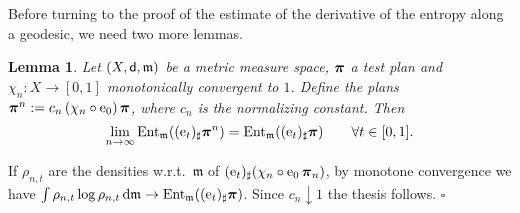 \documentclass[reqno,11pt]{article}
\numberwithin{equation}{section}
\newcommand{\mm}{{\mbox{\boldmath$m$}}}
\newcommand{\ppi}{{\mbox{\boldmath$\pi$}}}
\newcommand{\sfd}{{\sf d}}
\newcommand{\rme}{{\mathrm e}}
\renewcommand{\d}{{\mathrm d}}
\newenvironment{proof}{\removelastskip\par\medskip   %
\noindent{\em Proof.}
\rm}{\penalty-20\null\hfill$\square$\par\medbreak}
\newtheorem{lemma}[theorem]{Lemma}
\newcommand{\e}{{\rm{e}}}                           %
\newcommand{\entr}[2]{{\rm Ent}_{#2}(#1)}              %
\renewcommand{\mm}{\mathfrak m}
\begin{document}
Before turning to the proof of the estimate of the derivative of the
entropy along a geodesic, we need two more lemmas.

\begin{lemma}\label{le:apprentr}
Let $(X,\sfd,\mm)$ be a metric measure space, $\ppi$ a test plan and
$\chi_n:X\to[0,1]$ monotonically convergent to $1$. Define the plans
 $\ppi^n:=c_n\,(\chi_n\circ\rme_0)\,\ppi$, where $c_n$ is the
normalizing constant. Then
\[
\lim_{n\to\infty}\entr{(\e_t)_\sharp\ppi^n}\mm=\entr{(\e_t)_\sharp\ppi}\mm
\qquad\forall t\in [0,1].
\]
\end{lemma}
\begin{proof} If $\rho_{n,t}$ are the densities w.r.t.\ $\mm$ of
$(\e_t)_\sharp(\chi_n\circ\rme_0\,\ppi_n)$, by monotone convergence
we have
$\int\rho_{n,t}\log\rho_{n,t}\,\d\mm\to\entr{(\e_t)_\sharp\ppi}\mm$.
Since $c_n\downarrow 1$ the thesis follows.
\end{proof}
\end{document}
